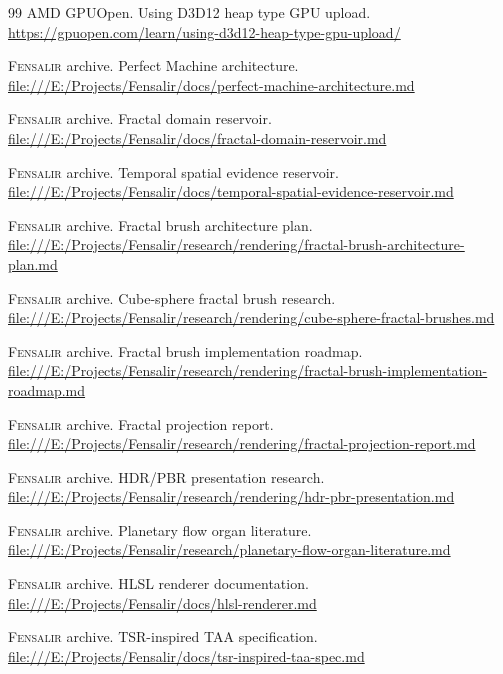 \documentclass[11pt]{article}
\newcommand{\Fensalir}{\textsc{Fensalir}}
\begin{document}
\begin{thebibliography}{99}
AMD GPUOpen.
\newblock Using D3D12 heap type GPU upload.
\newblock \url{https://gpuopen.com/learn/using-d3d12-heap-type-gpu-upload/}

\Fensalir{} archive.
\newblock Perfect Machine architecture.
\newblock \url{file:///E:/Projects/Fensalir/docs/perfect-machine-architecture.md}

\Fensalir{} archive.
\newblock Fractal domain reservoir.
\newblock \url{file:///E:/Projects/Fensalir/docs/fractal-domain-reservoir.md}

\Fensalir{} archive.
\newblock Temporal spatial evidence reservoir.
\newblock \url{file:///E:/Projects/Fensalir/docs/temporal-spatial-evidence-reservoir.md}

\Fensalir{} archive.
\newblock Fractal brush architecture plan.
\newblock \url{file:///E:/Projects/Fensalir/research/rendering/fractal-brush-architecture-plan.md}

\Fensalir{} archive.
\newblock Cube-sphere fractal brush research.
\newblock \url{file:///E:/Projects/Fensalir/research/rendering/cube-sphere-fractal-brushes.md}

\Fensalir{} archive.
\newblock Fractal brush implementation roadmap.
\newblock \url{file:///E:/Projects/Fensalir/research/rendering/fractal-brush-implementation-roadmap.md}

\Fensalir{} archive.
\newblock Fractal projection report.
\newblock \url{file:///E:/Projects/Fensalir/research/rendering/fractal-projection-report.md}

\Fensalir{} archive.
\newblock HDR/PBR presentation research.
\newblock \url{file:///E:/Projects/Fensalir/research/rendering/hdr-pbr-presentation.md}

\Fensalir{} archive.
\newblock Planetary flow organ literature.
\newblock \url{file:///E:/Projects/Fensalir/research/planetary-flow-organ-literature.md}

\Fensalir{} archive.
\newblock HLSL renderer documentation.
\newblock \url{file:///E:/Projects/Fensalir/docs/hlsl-renderer.md}

\Fensalir{} archive.
\newblock TSR-inspired TAA specification.
\newblock \url{file:///E:/Projects/Fensalir/docs/tsr-inspired-taa-spec.md}


\end{thebibliography}
\end{document}
